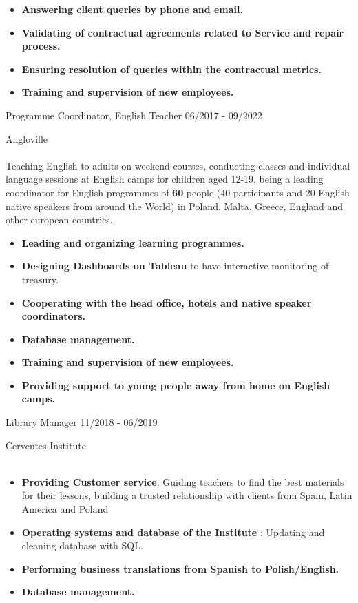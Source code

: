 \documentclass[11pt]{formatting/format} %
\begin{document}
\begin{entrylist}
{\begin{itemize}
\item \textbf{Answering client queries by phone and email.}
\item \textbf{Validating of contractual agreements related to Service and repair process.}
\item \textbf{Ensuring resolution of queries within the contractual metrics.}
\item \textbf{Training and supervision of new employees.} \\
\end{itemize}
 }
	\entry
		{\color{text} }
		{\color{text} \Large Programme Coordinator, English Teacher }
		{\large   06/2017 - 09/2022}
		{\color{text} \large Angloville \\\\
   \normalsize Teaching English to adults on weekend courses, conducting classes and individual language sessions at English camps for children aged 12-19, being a leading coordinator for English programmes of  \textbf{60} people (40 participants and 20 English native speakers from around the World) in Poland, Malta, Greece, England and other european countries.
  \begin{itemize} \item \normalsize \textbf{Leading and organizing learning programmes.}
 \item \textbf{Designing Dashboards on Tableau} to have interactive monitoring of treasury.
 \item \textbf{Cooperating with the head office, hotels and native speaker
coordinators. } 
 \item \textbf{Database management. } 
 \item \textbf{Training and supervision of new employees.} 
 \item \textbf{Providing support to young people away from home on English camps.}\\
  \end{itemize}
  }
  \entry
		{\color{text} }
		{\color{text} \Large Library Manager }
		{\large   11/2018 - 06/2019}
		{\color{text} \large Cerventes Institute \\\
   \normalsize 
  \begin{itemize} \item \normalsize \textbf{Providing Customer service}:  Guiding teachers to find the best materials for their lessons, building a trusted relationship with clients from Spain, Latin America and Poland   
 \item \textbf{Operating systems and database of the Institute} : Updating and cleaning database with SQL.
 \item \textbf{Performing business translations from Spanish to Polish/English.}
 \item \textbf{Database management.} 
 \\
  \end{itemize}
  }
\end{entrylist}
 
\end{document}
